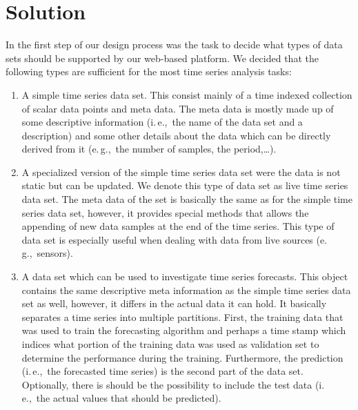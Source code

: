 \documentclass[runningheads,a4paper,11pt]{llncs}
\newcommand{\eg}{e.\,g.,\ }
\newcommand{\ie}{i.\,e.,\ }
\begin{document}
\section{Solution}\label{sec:solution}

In the first step of our design process was the task to decide what types of data sets should be supported by our web-based platform.
We decided that the following types are sufficient for the most time series analysis tasks:

\begin{enumerate}
 \item A simple time series data set. This consist mainly of a time indexed collection of scalar data points and meta data.
 The meta data is mostly made up of some descriptive information (\ie the name of the data set and a description) and some other details about the data which can be directly derived from it (\eg the number of samples, the period,\ldots).

 \item A specialized version of the simple time series data set were the data is not static but can be updated.
 We denote this type of data set as live time series data set.
 The meta data of the set is basically the same as for the simple time series data set, however, it provides special methods that allows the appending of new data samples at the end of the time series.
 This type of data set is especially useful when dealing with data from live sources (\eg sensors). 
 
 \item A data set which can be used to investigate time series forecasts.
 This object contains the same descriptive meta information as the simple time series data set as well, however, it differs in the actual data it can hold.
 It basically separates a time series into multiple partitions. 
 First, the training data that was used to train the forecasting algorithm and perhaps a time stamp which indices what portion of the training data was used as validation set to determine the performance during the training.
 Furthermore, the prediction (\ie the forecasted time series) is the second part of the data set.
 Optionally, there is should be the possibility to include the test data (\ie the actual values that should be predicted).
\end{enumerate}
\end{document}
